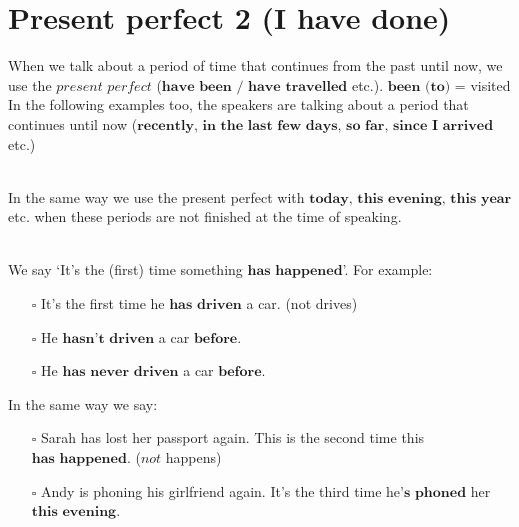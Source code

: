\section{Present perfect 2 (I have done)}
\label{Present perfect 2}
When we talk about a period of time that continues from the past until now, we use the $\textit{present perfect}$ ($\textbf{have been / have travelled}$ etc.).
$\textbf{been (to)}$ = visited
In the following examples too, the speakers are talking about a period that continues until now ($\textbf{recently, in the last few days, so far, since I arrived}$ etc.) \\
 \\
In the same way we use the present perfect with $\textbf{today, this evening, this year}$ etc. when these periods are not finished at the time of speaking. \\
 \\
We say `It's the (first) time something $\textbf{has happened}$'. For example:
\begin{itemize}
    \item[$\square$] It's the first time he $\textbf{has driven}$ a car. (not drives)
    \item[$\square$] He $\textbf{hasn't driven}$ a car $\textbf{before}$.
    \item[$\square$] He $\textbf{has never driven}$ a car $\textbf{before}$.
\end{itemize}
In the same way we say:
\begin{itemize}
    \item[$\square$] Sarah has lost her passport again. This is the second time this $\textbf{has happened}$. ($\textit{not}$ happens)
    \item[$\square$] Andy is phoning his girlfriend again. It's the third time he$\textbf{'s phoned}$ her $\textbf{this evening}$.
\end{itemize}

